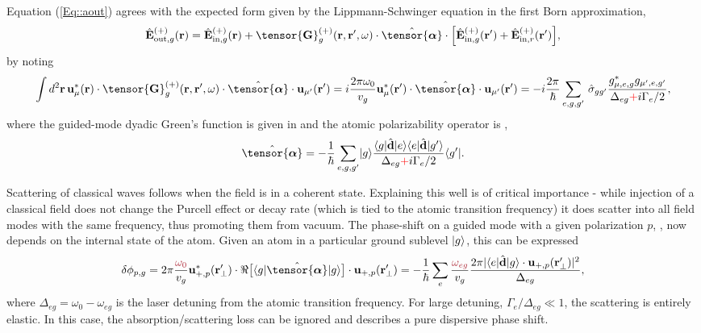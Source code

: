 \documentclass[preprint,aps,pra,onecolumn]{revtex4-1} %
\newcommand{\inp}{{\rm in}}
\newcommand{\out}{{\rm out}}
\newcommand{\poltens}{\hat{\tensor{\boldsymbol{\alpha}}}}
\newcommand{\comment}[1]{{\color{Maroon} #1}}
\newcommand{\error}[1]{{\color{red} #1}}
\begin{document}
Equation (\ref{Eq::aout}) agrees with the expected form given by the Lippmann-Schwinger equation in the first Born approximation,
	\begin{equation} \label{Eq::IOScatteredField}
		\hat{\mathbf{E}}^{(+)}_{\out,g}(\br)=\hat{\mathbf{E}}^{(+)}_{ \inp, g}(\br)+\tensor{\mathbf{G}}_g^{(+)}(\br,\br',\omega)\cdot \poltens \cdot \Big[\hat{\mathbf{E}}^{(+)}_{\inp, g}(\br')+\hat{\mathbf{E}}^{(+)}_{\inp,r}(\br') \Big],
	\end{equation}
by noting
	\begin{equation}
		\int d^2 \mbf{r} \, \mathbf{u}^*_{\mu} (\br)\cdot \tensor{\mathbf{G}}_g^{(+)}(\br,\br',\omega)\cdot 
\poltens \cdot \mathbf{u}_{\mu'} (\br') =  i \frac{ 2\pi \omega_0}{v_g} \mathbf{u}^*_\mu 
 (\br') \cdot \poltens \cdot \mathbf{u}_{\mu'} (\br') = - i \frac{2 \pi}{\hbar} \sum_{e,g,g'}\!\ 
 \hat{\sigma}_{gg'} \frac{g_{\mu,e,g}^* g_{\mu',e,g'}}{ \Delta_{eg} \error{+} i \Gamma_{e}/2 }, 
	\end{equation}
where the guided-mode dyadic Green's function is given in  and the atomic polarizability operator is \cite{buhmann_casimir-polder_2004, deutsch_quantum_2010,kien_dynamical_2013},
	\begin{equation} \label{Eq::PolarizabilityOperator}
		\poltens = - \frac{1}{\hbar} \sum_{e,g,g'}\ket{g}\frac{\bra{g}\hat{\mathbf{d}}\ket{e}\bra{e} 
\hat{\mathbf{d}}\ket{g'}}{\Delta_{eg}  \error{+} i \Gamma_{e}/2 }\bra{g'}.
	\end{equation}
	
Scattering of classical waves follows when the field is in a coherent state.  \comment{Explaining this well is of critical importance - while injection of a classical field does not change the Purcell effect or decay rate (which is tied to the atomic transition frequency) it does scatter into all field modes with the same frequency, thus promoting them from vacuum}.  The phase-shift on a guided mode with a given polarization $p$, , now depends on the internal state of the atom.  Given an atom in a particular ground sublevel $\lvert{g}\rangle$, this can be expressed \cite{le_kien_propagation_2014}
	\begin{equation} \label{Eq::PhaseShiftMultilevel}
		\delta  \phi_{p,g} =2\pi \frac{\comment{ \omega_{0}}}{v_g} \mathbf{u}^*_{+, p}(\br'_\perp) \cdot \Re \big[\bra{g} 
\hat{\tensor{\boldsymbol{\alpha}}} \ket{g} \big] \cdot \mathbf{u}_{+, p}(\br'_\perp) = -\frac{1}{\hbar} \sum_e \frac{ \comment{ \omega_{eg} } }{v_g} \frac{2 \pi |\bra{e}\hat{\mathbf{d}}\ket{g} \cdot \mathbf{u}_{+,p}(\br'_\perp)|^2}{ \Delta_{eg} } ,
	\end{equation}
where $\Delta_{eg} = \omega_0 - \omega_{eg}$ is the laser detuning from the atomic transition frequency.  For large detuning, $\Gamma_{e}/\Delta_{eg} \ll 1$, the scattering is entirely elastic.  In this case, the absorption/scattering loss can be ignored and  describes a pure dispersive phase shift.
\end{document}
